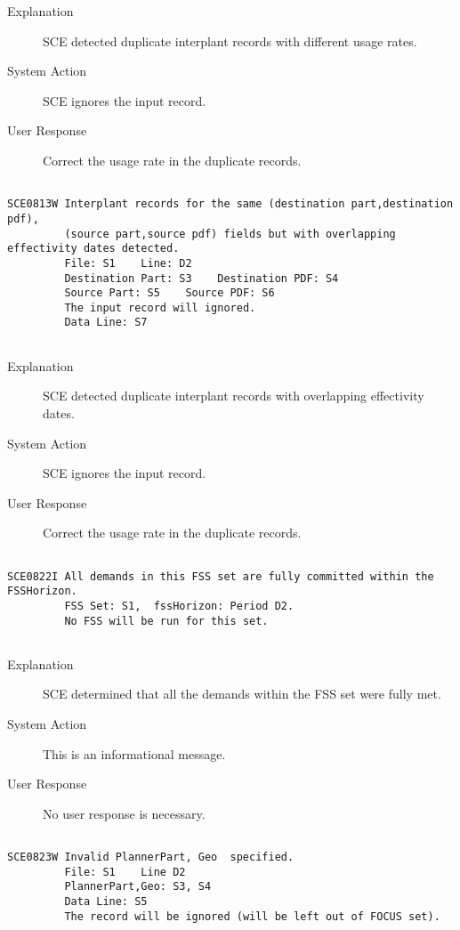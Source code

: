 \begin{description}
\item[Explanation]  SCE detected duplicate interplant records with different usage rates.

\item[System Action]  SCE ignores the input record.

\item[User Response]  Correct the usage rate in the duplicate records.
\end{description}
\hrulefill
\begin{verbatim}

SCE0813W Interplant records for the same (destination part,destination pdf),
         (source part,source pdf) fields but with overlapping effectivity dates detected.
         File: S1    Line: D2
         Destination Part: S3    Destination PDF: S4
         Source Part: S5    Source PDF: S6
         The input record will ignored.
         Data Line: S7
         
\end{verbatim}
\begin{description}
\item[Explanation]  SCE detected duplicate interplant records with overlapping effectivity dates.

\item[System Action]  SCE ignores the input record.

\item[User Response]  Correct the usage rate in the duplicate records.
\end{description}
\hrulefill
\begin{verbatim}

SCE0822I All demands in this FSS set are fully committed within the FSSHorizon.
         FSS Set: S1,  fssHorizon: Period D2.
         No FSS will be run for this set.
         
\end{verbatim}
\begin{description}
\item[Explanation]  SCE determined that all the demands within the FSS set were fully met.

\item[System Action]  This is an informational message.

\item[User Response]  No user response is necessary.
\end{description}
\hrulefill
\begin{verbatim}

SCE0823W Invalid PlannerPart, Geo  specified.
         File: S1    Line D2
         PlannerPart,Geo: S3, S4
         Data Line: S5
         The record will be ignored (will be left out of FOCUS set).
\end{verbatim}
